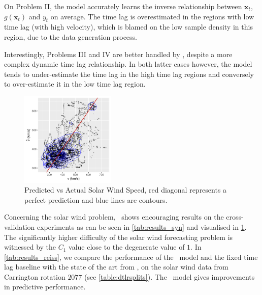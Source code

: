 On Problem II, the model accurately learns the inverse 
relationship between $\mathbf{x}_t$, $g(\mathbf{x}_t)$ and $y_t$ on average. 
The time lag is overestimated in the regions with low time lag 
(with high velocity), which is blamed on the low sample density in this region, 
due to the data generation process.

Interestingly, Problems III and IV are better handled by \XX, despite a more 
complex dynamic time lag relationship. In both latter cases however, the model 
tends to under-estimate the time lag in the high time lag regions and 
conversely to over-estimate it in the low time lag region. 

\begin{figure}
  \centering
  \includegraphics[width=0.4\textwidth]{figures/test_scatter_v}
  \caption{
    Predicted vs Actual Solar Wind Speed, 
    red diagonal represents a perfect prediction and blue lines are contours.} 
  \label{fig:sw_preds}
\end{figure}

Concerning the solar wind problem, \XX\ shows encouraging results on the 
cross-validation experiments as can be seen in \cref{tab:results_syn} and 
visualised in \cref{fig:sw_preds}. The significantly higher difficulty of the 
solar wind forecasting problem is witnessed by the $C_1$ value close to the 
degenerate value of $1$. 
%
In \cref{tab:results_reiss}, we compare the performance of the \XX \ model and the fixed time lag 
baseline with the state of the art from \citet{Reiss_2019}, on the solar wind data from Carrington 
rotation $2077$ (see \cref{table:dtlrsplits}). The \XX \ model gives improvements in predictive 
performance.

